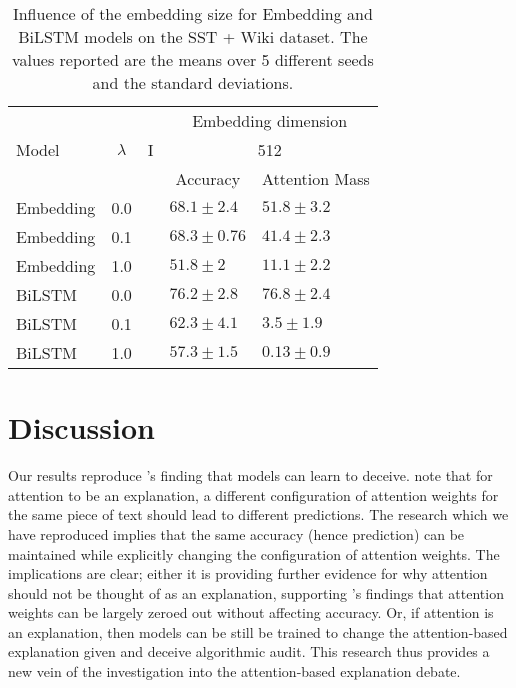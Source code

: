\begin{table}[H]
\centering
\caption{Influence of the embedding size for Embedding and BiLSTM models on the SST + Wiki dataset. The values reported are the means over 5 different seeds and the standard deviations.}
\label{tab:embedding-results-2}
\begin{tabular}{lccll} 
\toprule
          &           &   & \multicolumn{2}{c}{Embedding dimension}              \\
Model     & $\lambda$ & I & \multicolumn{2}{c}{512}                              \\ 
\cline{4-5}
          &           &   & \multicolumn{1}{c}{Accuracy} & \multicolumn{1}{c}{Attention Mass}  \\ 
\midrule
Embedding & 0.0       &   & $68.1 \pm 2.4$           & $51.8 \pm 3.2$            \\
Embedding & 0.1       &   & $68.3 \pm 0.76$          & $41.4 \pm 2.3$            \\
Embedding & 1.0       &   & $51.8 \pm 2$             & $11.1 \pm 2.2$            \\ 
\midrule
BiLSTM    & 0.0       &   & $76.2 \pm 2.8$           & $76.8 \pm 2.4$            \\
BiLSTM    & 0.1       &   & $62.3 \pm 4.1$           & $3.5 \pm 1.9$             \\
BiLSTM    & 1.0       &   & $57.3 \pm 1.5$           & $0.13 \pm 0.9$            \\
\bottomrule
\end{tabular}
\end{table}

\section{Discussion}

Our results reproduce \citet{pruthi-etal-2020-learning}'s finding that models can learn to deceive. \citet{jain2019attention} note that for attention to be an explanation, a different configuration of attention weights for the same piece of text should lead to different predictions. The research which we have reproduced implies that the same accuracy (hence prediction) can be maintained while explicitly changing the configuration of attention weights. The implications are clear; either it is providing further evidence for why attention should not be thought of as an explanation, supporting \citet{serrano2019attention}'s findings that attention weights can be largely zeroed out without affecting accuracy. Or, if attention is an explanation, then models can be still be trained to change the attention-based explanation given and deceive algorithmic audit. This research thus provides a new vein of the investigation into the attention-based explanation debate.

